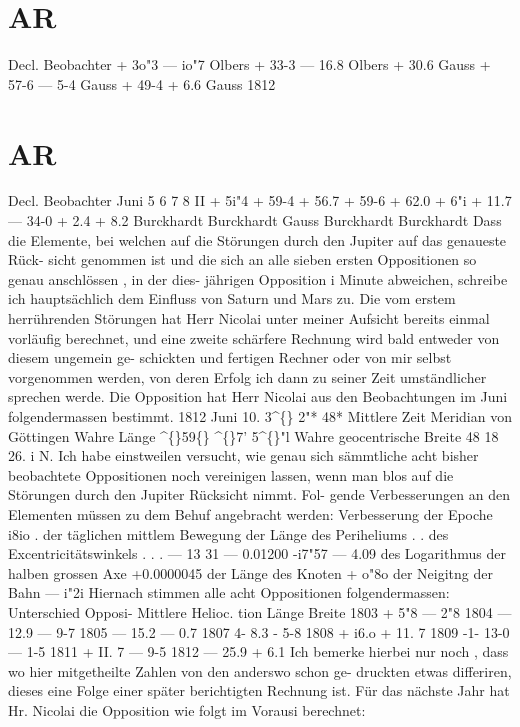 \documentclass[12pt,a4paper]{article}
\newcommand{\degree}{\textdegree}
\begin{document}
\section*{AR}
Decl. 
Beobachter 
+  3o"3 
---  io"7 
Olbers 
+  33-3 
---  16.8 
Olbers 
+  30.6 
Gauss 
+  57-6 
---    5-4 
Gauss 
+  49-4 
+    6.6 
Gauss 
1812 

\section*{AR}
Decl. 
Beobachter 
Juni    5 
6 
7 
8 
II 
+  5i"4 
+  59-4 
+  56.7 
+  59-6 
+  62.0 
+    6"i 
+  11.7 
---  34-0 
+    2.4 
+    8.2 
Burckhardt 
Burckhardt 
Gauss 
Burckhardt 
Burckhardt 
Dass  die  Elemente,  bei  welchen  auf  die  Störungen  durch  den  Jupiter  auf  das  genaueste  Rück- 
sicht genommen  ist  und  die  sich  an  alle  sieben  ersten  Oppositionen  so  genau  anschlössen ,  in  der  dies- 
jährigen Opposition  i  Minute  abweichen,  schreibe  ich  hauptsächlich  dem  Einfluss  von  Saturn  und  Mars 
zu.  Die  vom  erstem  herrührenden  Störungen  hat  Herr  Nicolai  unter  meiner  Aufsicht  bereits  einmal 
vorläufig  berechnet,  und  eine  zweite  schärfere  Rechnung  wird  bald  entweder  von  diesem  ungemein  ge- 
schickten und  fertigen  Rechner  oder  von  mir  selbst  vorgenommen  werden,  von  deren  Erfolg  ich  dann 
zu  seiner  Zeit  umständlicher  sprechen  werde. 
Die  Opposition  hat  Herr  Nicolai  aus  den  Beobachtungen  im  Juni  folgendermassen  bestimmt. 
1812  Juni  10.     3\textasciicircum\{\}  2"*  48*  Mittlere  Zeit  Meridian  von  Göttingen 
Wahre  Länge   
\textasciicircum\{\}59\degree\{\}  \textasciicircum\{\}7'   5\textasciicircum\{\}"l 
Wahre  geocentrische  Breite   
48    18    26.  i  N. 
Ich  habe  einstweilen  versucht,  wie  genau  sich  sämmtliche  acht  bisher  beobachtete  Oppositionen 
noch  vereinigen  lassen,  wenn  man  blos  auf  die  Störungen  durch  den  Jupiter  Rücksicht  nimmt.  Fol- 
gende Verbesserungen  an  den  Elementen  müssen  zu  dem  Behuf  angebracht  werden: 
Verbesserung  der  Epoche  i8io  . 
der  täglichen  mittlem  Bewegung 
der  Länge  des  Periheliums  .  . 
des  Excentricitätswinkels   .     .     . 
---  13  31 
---  0.01200 
-i7"57 
---  4.09 
des  Logarithmus  der  halben  grossen  Axe   
+0.0000045 
der  Länge  des  Knoten   
+  o"8o 
der  Neigitng  der  Bahn   
---  i"2i 
Hiernach  stimmen  alle  acht  Oppositionen  folgendermassen: 
Unterschied 
Opposi- 
Mittlere 
Helioc. 
tion 
Länge 
Breite 
1803 
+    5"8 
---    2"8 
1804 
---  12.9 
---  9-7 
1805 
---  15.2 
---  0.7 
1807 
4-  8.3 
-  5-8 
1808 
+  i6.o 
+  11. 7 
1809 
-1-  13-0 
---  1-5 
1811 
+  II.  7 
---  9-5 
1812 
---  25.9 
+  6.1 
Ich  bemerke  hierbei  nur  noch ,    dass   wo   hier  mitgetheilte  Zahlen    von   den   anderswo  schon  ge- 
druckten etwas  differiren,  dieses  eine  Folge  einer  später  berichtigten  Rechnung  ist. 
Für  das  nächste  Jahr  hat  Hr.  Nicolai  die  Opposition  wie  folgt  im    Vorausi  berechnet: 
\end{document}
